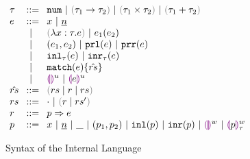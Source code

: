 
\begin{figure}[ht]
  $\arraycolsep=4pt\begin{array}{lll}
    \tau & ::= &
      \tnum ~\vert~
      \tarr{\tau_1}{\tau_2} ~\vert~
      \tprod{\tau_1}{\tau_2} ~\vert~
      \tsum{\tau_1}{\tau_2} \\
    e & ::= &
      x ~\vert~
      \hnum{n} \\
      & ~\vert~ &
      \hlam{x}{\tau}{e} ~\vert~
      \hap{e_1}{e_2} \\
      & ~\vert~ &
      \hpair{e_1}{e_2} ~\vert~
      \hprl{e} ~\vert~ \hprr{e} \\
      & ~\vert~ &
      \hinl{\tau}{e} ~\vert~
      \hinr{\tau}{e} \\
      & ~\vert~ &
      \hmatch{e}{\hat{rs}} \\
      & ~\vert~ &
      \hehole{u} ~\vert~
      \hhole{e}{u} \\
    \hat{rs} & ::= &
      \zrulsP{rs}{r}{rs} \\
    rs & ::= &
      \cdot ~\vert~ \hrulesP{r}{rs'} \\
    r & ::= &
      \hrul{p}{e} \\
    p & ::= &
      x ~\vert~
      \hnum{n} ~\vert~
      \_ ~\vert~
      \hpair{p_1}{p_2} ~\vert~
      \hinlp{p} ~\vert~
      \hinrp{p} ~\vert~
      \heholep{w} ~\vert~
      \hholep{p}{w}{\tau}
    \end{array}$
\caption{Syntax of the Internal Language}
\label{fig:syntax}
\end{figure}
